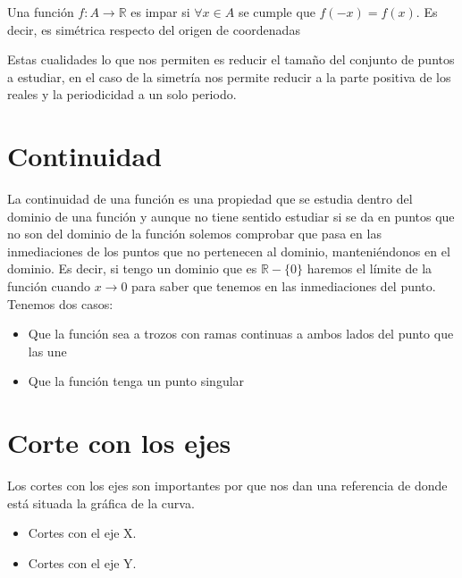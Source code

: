 \begin{defi}
Una función $f:A \longrightarrow \mathbb{R}$ es impar si $\forall x \in A$ se cumple que $f(-x)=f(x)$. Es decir, es simétrica respecto del origen de coordenadas 
\end{defi}
\begin{figure}[H]
\graphicspath{{imagenes_analisis/}}

\end{figure}
\noindent
Estas cualidades lo que nos permiten es reducir el tamaño del conjunto de puntos a estudiar, en el caso de la simetría nos permite reducir a la parte positiva de los reales y la periodicidad a un solo periodo. 
\newpage


\section{Continuidad}

La continuidad de una función es una propiedad que se estudia dentro del dominio de una función y aunque no tiene sentido estudiar si se da en puntos que no son del dominio de la función solemos comprobar que pasa en las inmediaciones de los puntos que no pertenecen al dominio, manteniéndonos en el dominio. Es decir, si tengo un dominio que es $\mathbb{R}-\lbrace 0 \rbrace$ haremos el límite de la función cuando $x\to 0 $ para saber que tenemos en las inmediaciones del punto. Tenemos dos casos: 
\begin{itemize}
\item Que la función sea a trozos con ramas continuas a ambos lados del punto que las une
\begin{ejemplo}
\end{ejemplo}
\item Que la función tenga un punto singular 
\begin{ejemplo}
\end{ejemplo}
\end{itemize}
\newpage
\section{Corte con los ejes}
Los cortes con los ejes son importantes por que nos dan una referencia de donde está situada la gráfica de la curva. 
\begin{itemize}
\item Cortes con el eje X. 
\item Cortes con el eje Y.
\end{itemize}
